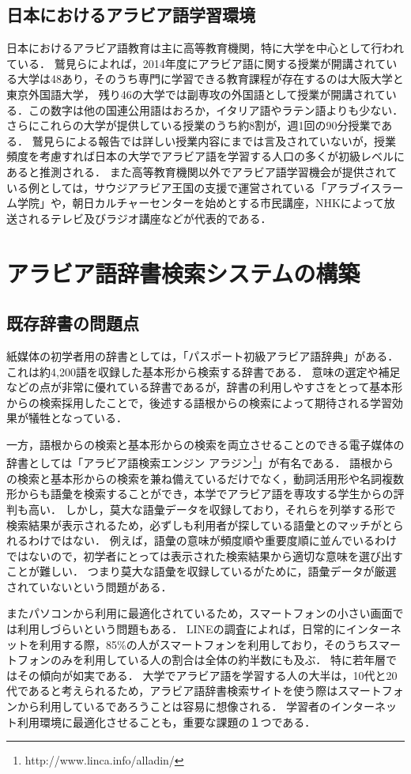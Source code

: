 \documentclass[technicalreport]{ieicej}
\begin{document}
\subsection{日本におけるアラビア語学習環境}
日本におけるアラビア語教育は主に高等教育機関，特に大学を中心として行われている．
鷲見\cite{washimi2016}らによれば，2014年度にアラビア語に関する授業が開講されている大学は48あり，そのうち専門に学習できる教育課程が存在するのは大阪大学と東京外国語大学， 残り46の大学では副専攻の外国語として授業が開講されている．この数字は他の国連公用語はおろか，イタリア語やラテン語よりも少ない．
さらにこれらの大学が提供している授業のうち約8割が，週1回の90分授業である．
鷲見らによる報告では詳しい授業内容にまでは言及されていないが，授業頻度を考慮すれば日本の大学でアラビア語を学習する人口の多くが初級レベルにあると推測される．
また高等教育機関以外でアラビア語学習機会が提供されている例としては，サウジアラビア王国の支援で運営されている「アラブイスラーム学院」や，朝日カルチャーセンターを始めとする市民講座，NHKによって放送されるテレビ及びラジオ講座などが代表的である．

\section{アラビア語辞書検索システムの構築}
\subsection{既存辞書の問題点}
紙媒体の初学者用の辞書としては，「パスポート初級アラビア語辞典」がある．
これは約4,200語を収録した基本形から検索する辞書である．
意味の選定や補足などの点が非常に優れている辞書であるが，辞書の利用しやすさをとって基本形からの検索採用したことで，後述する語根からの検索によって期待される学習効果が犠牲となっている．

一方，語根からの検索と基本形からの検索を両立させることのできる電子媒体の辞書としては「アラビア語検索エンジン アラジン\footnote{http://www.linca.info/alladin/}」が有名である．
語根からの検索と基本形からの検索を兼ね備えているだけでなく，動詞活用形や名詞複数形からも語彙を検索することができ，本学でアラビア語を専攻する学生からの評判も高い．
しかし，莫大な語彙データを収録しており，それらを列挙する形で検索結果が表示されるため，必ずしも利用者が探している語彙とのマッチがとられるわけではない．
例えば，語彙の意味が頻度順や重要度順に並んでいるわけではないので，初学者にとっては表示された検索結果から適切な意味を選び出すことが難しい．
つまり莫大な語彙を収録しているがために，語彙データが厳選されていないという問題がある．

またパソコンから利用に最適化されているため，スマートフォンの小さい画面では利用しづらいという問題もある．
LINEの調査によれば，日常的にインターネットを利用する際，85\%の人がスマートフォンを利用しており，そのうちスマートフォンのみを利用している人の割合は全体の約半数にも及ぶ．
特に若年層ではその傾向が如実である．
大学でアラビア語を学習する人の大半は，10代と20代であると考えられるため，アラビア語辞書検索サイトを使う際はスマートフォンから利用しているであろうことは容易に想像される．
学習者のインターネット利用環境に最適化させることも，重要な課題の１つである．
\end{document}
